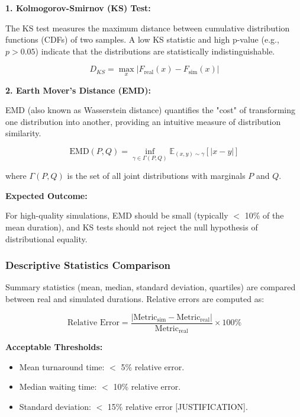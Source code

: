         \textbf{1. Kolmogorov-Smirnov (KS) Test:}
        
        The KS test measures the maximum distance between cumulative distribution functions (CDFs) of two samples. A low KS statistic and high p-value (e.g., $p > 0.05$) indicate that the distributions are statistically indistinguishable.
        
        \begin{equation}
            D_{KS} = \max_x |F_{\text{real}}(x) - F_{\text{sim}}(x)|
        \end{equation}
        
        \textbf{2. Earth Mover's Distance (EMD):}
        
        EMD (also known as Wasserstein distance) quantifies the "cost" of transforming one distribution into another, providing an intuitive measure of distribution similarity.
        
        \begin{equation}
            \text{EMD}(P, Q) = \inf_{\gamma \in \Gamma(P, Q)} \mathbb{E}_{(x, y) \sim \gamma} [|x - y|]
        \end{equation}
        
        where $\Gamma(P, Q)$ is the set of all joint distributions with marginals $P$ and $Q$.
        
        \textbf{Expected Outcome:}
        
        For high-quality simulations, EMD should be small (typically $<$ 10\% of the mean duration), and KS tests should not reject the null hypothesis of distributional equality.

        \subsubsection{Descriptive Statistics Comparison}
        
        Summary statistics (mean, median, standard deviation, quartiles) are compared between real and simulated durations. Relative errors are computed as:
        
        \begin{equation}
            \text{Relative Error} = \frac{|\text{Metric}_{\text{sim}} - \text{Metric}_{\text{real}}|}{\text{Metric}_{\text{real}}} \times 100\%
        \end{equation}
        
        \textbf{Acceptable Thresholds:}
        
        \begin{itemize}
            \item Mean turnaround time: $<$ 5\% relative error.
            \item Median waiting time: $<$ 10\% relative error.
            \item Standard deviation: $<$ 15\% relative error [JUSTIFICATION].
        \end{itemize}
        

